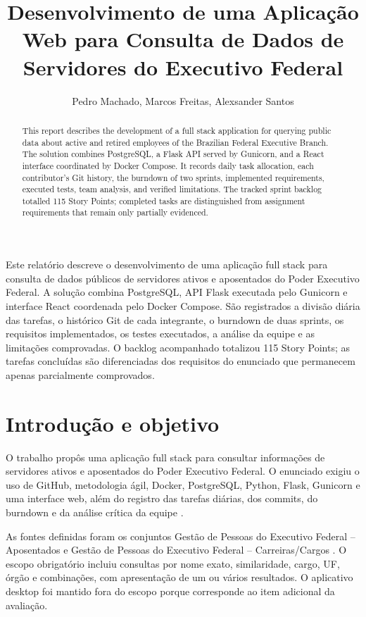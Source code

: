 \documentclass[12pt]{article}
\title{Desenvolvimento de uma Aplicação Web para Consulta de Dados de Servidores do Executivo Federal}
\author{Pedro Machado\inst{1}, Marcos Freitas\inst{1},
  Alexsander Santos\inst{1}}
\begin{document}
\maketitle

\begin{abstract}
  This report describes the development of a full stack application for
  querying public data about active and retired employees of the Brazilian
  Federal Executive Branch. The solution combines PostgreSQL, a Flask API
  served by Gunicorn, and a React interface coordinated by Docker Compose.
  It records daily task allocation, each contributor's Git history, the
  burndown of two sprints, implemented requirements, executed tests, team
  analysis, and verified limitations. The tracked sprint backlog totalled 115
  Story Points; completed tasks are distinguished from assignment requirements
  that remain only partially evidenced.
\end{abstract}

\begin{resumo}
  Este relatório descreve o desenvolvimento de uma aplicação full stack para
  consulta de dados públicos de servidores ativos e aposentados do Poder
  Executivo Federal. A solução combina PostgreSQL, API Flask executada pelo
  Gunicorn e interface React coordenada pelo Docker Compose. São registrados a
  divisão diária das tarefas, o histórico Git de cada integrante, o burndown de
  duas sprints, os requisitos implementados, os testes executados, a análise da
  equipe e as limitações comprovadas. O backlog acompanhado totalizou 115 Story
  Points; as tarefas concluídas são diferenciadas dos requisitos do enunciado
  que permanecem apenas parcialmente comprovados.
\end{resumo}

\section{Introdução e objetivo}

O trabalho propôs uma aplicação full stack para consultar informações de
servidores ativos e aposentados do Poder Executivo Federal. O enunciado exigiu
o uso de GitHub, metodologia ágil, Docker, PostgreSQL, Python, Flask, Gunicorn e
uma interface web, além do registro das tarefas diárias, dos commits, do
burndown e da análise crítica da equipe \cite{enunciado2026}.

As fontes definidas foram os conjuntos Gestão de Pessoas do Executivo Federal
-- Aposentados e Gestão de Pessoas do Executivo Federal -- Carreiras/Cargos
\cite{dadosAposentados,dadosCarreiras}. O escopo obrigatório incluiu consultas
por nome exato, similaridade, cargo, UF, órgão e combinações, com apresentação
de um ou vários resultados. O aplicativo desktop foi mantido fora do escopo
porque corresponde ao item adicional da avaliação.
\end{document}
